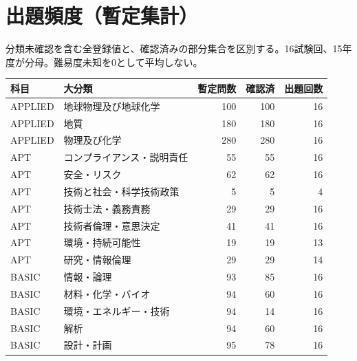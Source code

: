 \chapter{出題頻度（暫定集計）}
分類未確認を含む全登録値と、確認済みの部分集合を区別する。16試験回、15年度が分母。難易度未知を0として平均しない。
\begin{longtable}{p{.16\linewidth}p{.42\linewidth}rrr}
科目 & 大分類 & 暫定問数 & 確認済 & 出題回数\\\hline
APPLIED & 地球物理及び地球化学 & 100 & 100 & 16\\
APPLIED & 地質 & 180 & 180 & 16\\
APPLIED & 物理及び化学 & 280 & 280 & 16\\
APT & コンプライアンス・説明責任 & 55 & 55 & 16\\
APT & 安全・リスク & 62 & 62 & 16\\
APT & 技術と社会・科学技術政策 & 5 & 5 & 4\\
APT & 技術士法・義務責務 & 29 & 29 & 16\\
APT & 技術者倫理・意思決定 & 41 & 41 & 16\\
APT & 環境・持続可能性 & 19 & 19 & 13\\
APT & 研究・情報倫理 & 29 & 29 & 14\\
BASIC & 情報・論理 & 93 & 85 & 16\\
BASIC & 材料・化学・バイオ & 94 & 60 & 16\\
BASIC & 環境・エネルギー・技術 & 94 & 14 & 16\\
BASIC & 解析 & 94 & 60 & 16\\
BASIC & 設計・計画 & 95 & 78 & 16\\
\end{longtable}
